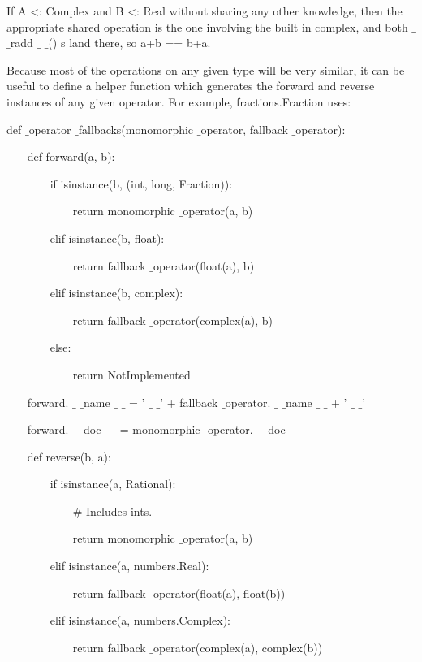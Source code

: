 If A <: Complex and B <: Real without sharing any other knowledge, then the appropriate shared operation is the one involving the built in complex, and both  $  \_  $ $  \_  $radd $  \_  $ $  \_  $() s land there, so a+b == b+a. \par
Because most of the operations on any given type will be very similar, it can be useful to define a helper function which generates the forward and reverse instances of any given operator. For example, fractions.Fraction uses: \par
def  $  \_  $operator $  \_  $fallbacks(monomorphic $  \_  $operator, fallback $  \_  $operator): \par
~~~ def forward(a, b): \par
~~~~~~~ if isinstance(b, (int, long, Fraction)): \par
~~~~~~~~~~~ return monomorphic $  \_  $operator(a, b) \par
~~~~~~~ elif isinstance(b, float): \par
~~~~~~~~~~~ return fallback $  \_  $operator(float(a), b) \par
~~~~~~~ elif isinstance(b, complex): \par
~~~~~~~~~~~ return fallback $  \_  $operator(complex(a), b) \par
~~~~~~~ else: \par
~~~~~~~~~~~ return NotImplemented \par
~~~ forward. $  \_  $ $  \_  $name $  \_  $ $  \_  $ = ' $  \_  $ $  \_  $' + fallback $  \_  $operator. $  \_  $ $  \_  $name $  \_  $ $  \_  $ + ' $  \_  $ $  \_  $' \par
~~~ forward. $  \_  $ $  \_  $doc $  \_  $ $  \_  $ = monomorphic $  \_  $operator. $  \_  $ $  \_  $doc $  \_  $ $  \_  $ \par
\vspace{12pt}
~~~ def reverse(b, a): \par
~~~~~~~ if isinstance(a, Rational): \par
~~~~~~~~~~~  $  \#  $ Includes ints. \par
~~~~~~~~~~~ return monomorphic $  \_  $operator(a, b) \par
~~~~~~~ elif isinstance(a, numbers.Real): \par
~~~~~~~~~~~ return fallback $  \_  $operator(float(a), float(b)) \par
~~~~~~~ elif isinstance(a, numbers.Complex): \par
~~~~~~~~~~~ return fallback $  \_  $operator(complex(a), complex(b)) \par
